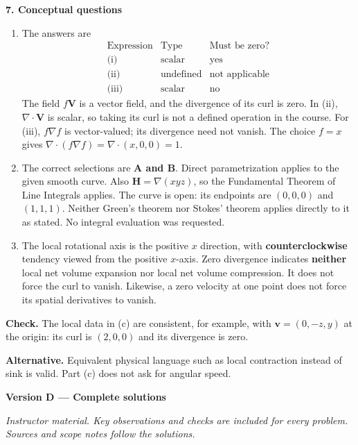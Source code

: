 \documentclass[11pt,letterpaper]{article}
\newcommand{\dv}{\nabla\cdot}
\renewcommand{\vec}[1]{\mathbf{#1}}
\newcommand{\grad}{\nabla}
\newcommand{\solutionproblem}[3]{%
  \par\bigskip\Needspace{7\baselineskip}
  \noindent\textbf{#1. #2}\par\nobreak
}
\newcommand{\verification}[1]{\par\textbf{Check.} #1\par}
\newcommand{\alternative}[1]{\par\textbf{Alternative.} #1\par}
\begin{document}
\solutionproblem{7}{Conceptual questions}{14}
\begin{enumerate}[label=(\alph*)]
\item The answers are
\[
\begin{array}{c|c|c}
\text{Expression}&\text{Type}&\text{Must be zero?}\\\hline
\text{(i)}&\text{scalar}&\text{yes}\\
\text{(ii)}&\text{undefined}&\text{not applicable}\\
\text{(iii)}&\text{scalar}&\text{no}
\end{array}
\]
The field $f\vec V$ is a vector field, and the divergence of its curl
is zero. In (ii), $\dv\vec V$ is scalar, so taking its curl is not a
defined operation in the course. For (iii), $f\grad f$ is vector-valued;
its divergence need not vanish. The choice $f=x$ gives
$\dv(f\grad f)=\dv(x,0,0)=1$.

\item The correct selections are \textbf{A and B}. Direct parametrization
applies to the given smooth curve. Also
$\vec H=\grad(xyz)$, so the Fundamental Theorem of Line Integrals applies.
The curve is open: its endpoints are $(0,0,0)$ and $(1,1,1)$.
Neither Green's theorem nor Stokes' theorem applies directly to it as
stated. No integral evaluation was requested.

\item The local rotational axis is the positive $x$ direction, with
\textbf{counterclockwise} tendency viewed from the positive $x$-axis.
Zero divergence indicates \textbf{neither} local net volume expansion
nor local net volume compression. It does not force the curl to vanish.
Likewise, a zero velocity at one point does not force its spatial
derivatives to vanish.
\end{enumerate}
\verification{The local data in (c) are consistent, for example, with
$\vec v=(0,-z,y)$ at the origin: its curl is $(2,0,0)$ and
its divergence is zero.}
\alternative{Equivalent physical language such as local contraction
instead of sink is valid. Part (c) does not ask for angular speed.}

\clearpage
\setcounter{page}{1}
{\large\bfseries Version D --- Complete solutions}
\par\textit{Instructor material. Key observations and checks are included
for every problem. Sources and scope notes follow the solutions.}
\end{document}
